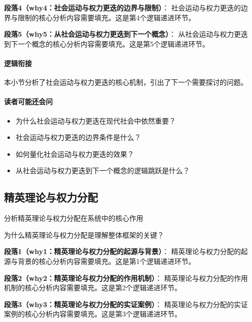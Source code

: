 \documentclass[../main.tex]{subfiles}
\begin{document}
{{\textbf{段落4（why4：社会运动与权力更迭的边界与限制）}：
社会运动与权力更迭的边界与限制的核心分析内容需要填充。这是第4个逻辑递进环节。


\textbf{段落5（why5：从社会运动与权力更迭到下一个概念）}：
从社会运动与权力更迭到下一个概念的核心分析内容需要填充。这是第5个逻辑递进环节。


\paragraph*{逻辑衔接}
本小节分析了社会运动与权力更迭的核心机制，引出了下一个需要探讨的问题。

\paragraph*{读者可能还会问}
\begin{itemize}
\item 为什么社会运动与权力更迭在现代社会中依然重要？
\item 社会运动与权力更迭的边界条件是什么？
\item 如何量化社会运动与权力更迭的效果？
\item 从社会运动与权力更迭到下一个概念的逻辑跳跃是什么？
\end{itemize}


\subsection{精英理论与权力分配}

\begin{motivation}
分析精英理论与权力分配在系统中的核心作用
\end{motivation}

\begin{logicmap}
[逻辑链占位]
\end{logicmap}

\begin{questionbox}
为什么精英理论与权力分配是理解整体框架的关键？
\end{questionbox}

\textbf{段落1（why1：精英理论与权力分配的起源与背景）}：
精英理论与权力分配的起源与背景的核心分析内容需要填充。这是第1个逻辑递进环节。


\textbf{段落2（why2：精英理论与权力分配的作用机制）}：
精英理论与权力分配的作用机制的核心分析内容需要填充。这是第2个逻辑递进环节。


\textbf{段落3（why3：精英理论与权力分配的实证案例）}：
精英理论与权力分配的实证案例的核心分析内容需要填充。这是第3个逻辑递进环节。


}}
\end{document}
